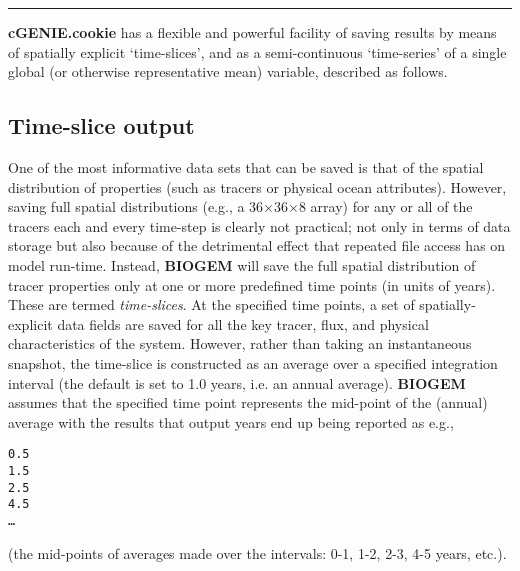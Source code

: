 \vspace{1mm}\noindent\rule{4cm}{0.5pt}\vspace{2mm}

\noindent \textbf{cGENIE.cookie} has a flexible and powerful facility of saving results by means of spatially explicit ‘time-slices’, and as a semi-continuous ‘time-series’ of a single global (or otherwise representative mean) variable, described as follows.


\subsection{Time-slice output}

One of the most informative data sets that can be saved is that of the spatial distribution of properties (such as tracers or physical ocean attributes). However, saving full spatial distributions (e.g., a 36\(\times\)36\(\times\)8 array) for any or all of the tracers each and every time-step is clearly not practical; not only in terms of data storage but also because of the detrimental effect that repeated file access has on model run-time.
Instead, \textbf{BIOGEM} will save the full spatial distribution of tracer properties only at one or more predefined time points (in units of years). These are termed \textit{time-slices}. At the specified time points, a set of spatially-explicit data fields are saved for all the key tracer, flux, and physical characteristics of the system. However, rather than taking an instantaneous snapshot, the time-slice is constructed as an average over a specified integration interval (the default is set to 1.0 years, i.e. an annual average). \textbf{BIOGEM}  assumes that the specified time point represents the mid-point of the (annual) average with the results that output years end up being reported as e.g.,

\vspace{-1mm}\small\begin{verbatim}
0.5
1.5
2.5
4.5
…
\end{verbatim}\normalsize\vspace{-1mm}
(the mid-points of averages made over the intervals: 0-1, 1-2, 2-3, 4-5 years, etc.).

\newpage

